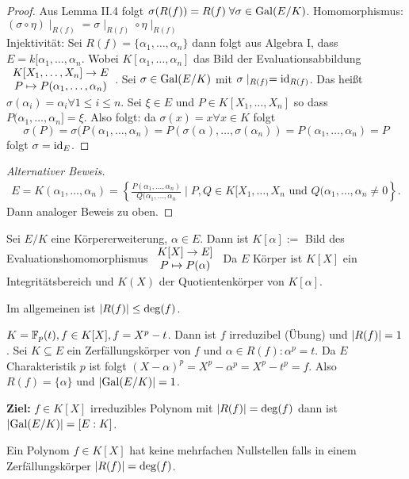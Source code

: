 \begin{proof}
	Aus Lemma II.4 folgt $\sigma(R(f)) = R(f) \forall \sigma \in \gal(E / K)$.
	Homomorphismus: $(\sigma \circ \eta) \mid_{R(f)} = \sigma \mid_{R(f)} \circ \eta \mid_{R(f)}$\\
	Injektivität: Sei $R(f) = \{\alpha_1,\ldots,\alpha_{n}\} $ dann folgt aus Algebra I, dass $E = k[\alpha_1,\ldots,\alpha_{n}$.
	Wobei $K[\alpha_1,\ldots,\alpha_{n}]$ das Bild der Evaluationsabbildung $\begin{array}{c} K[X_1,\ldots,X_{n}] \to E\\ P \mapsto P(\alpha_1,\ldots,\alpha_{n})\\ \end{array}$.
	Sei $\sigma \in \operatorname{Gal}(E / K)$ mit $\sigma \mid_{R(f)} = \operatorname{id}_{R(f)}$. Das heißt $\sigma(\alpha_i) = \alpha_{i} \forall 1 \leq i \leq n$.
	Sei $\xi \in E$ und $P \in K[X_1,\ldots,X_{n}]$ so dass $P(\alpha_1,\ldots,\alpha_{n}] = \xi$.
	Also folgt: da $\sigma(x) = x \forall x \in K$ folgt 
	\[
		\sigma(P) = \sigma(P(\alpha_1,\ldots,\alpha_{n}) = P(\sigma(\alpha),\ldots,\sigma(\alpha_{n})) = P(\alpha_1,\ldots,\alpha_{n}) = P
	\]
	folgt $\sigma = \operatorname{id}_{E}$.
\end{proof}

\begin{proof}[Alternativer Beweis]
	\begin{align*}
		E = K(\alpha_1,\ldots,\alpha_{n}) = \left\{ \frac{P(\alpha_1,\ldots,\alpha_{n})}{Q(\alpha_1,\ldots,\alpha_{n}} \mid P,Q \in K[X_1,\ldots,X_{n} \text{ und } Q(\alpha_1,\ldots,\alpha_{n} \neq 0 \right\} 
	.\end{align*}
	Dann analoger Beweis zu oben.
\end{proof}

Sei $E / K$ eine Körpererweiterung, $\alpha \in E$. Dann ist $K[\alpha] := $ Bild des Evaluationshomomorphismus $\begin{array}{c} K[X] \to E]\\ P \mapsto P(\alpha)\\ \end{array}$ 
Da $E$ Körper ist $K[X]$ ein Integritätsbereich und $K(X)$ der Quotientenkörper von $K[\alpha]$.

Im allgemeinen ist $\abs{R(f)} \leq \deg(f)$. 
\begin{eg}
	$K = \mathbb{F}_{p}(t), f \in K[X], f = X^{p}-t$.
	Dann ist $f$ irreduzibel (Übung) und $\abs{R(f)} = 1$.
	Sei $K \subseteq E$ ein Zerfällungskörper von $f$ und $\alpha \in R(f): \alpha^{p} = t$.
	Da $E$ Charakteristik $p$ ist folgt $(X-\alpha)^{p} = X^{p} - \alpha^{p} = X^{p} - t^{p} = f$.
	Also $R(f) = \{\alpha\}$ und $\abs{\operatorname{Gal}(E / K)} = 1$.
\end{eg}

\textbf{Ziel:} $f \in K[X]$ irreduzibles Polynom mit $\abs{R(f)} = \deg(f)$ dann ist  $\abs{\operatorname{Gal}(E / K)} = [E:K]$.

\begin{definition}
	Ein Polynom $f \in K[X]$ hat keine mehrfachen Nullstellen falls in einem Zerfällungskörper $\abs{R(f)} = \deg(f)$.
\end{definition}

